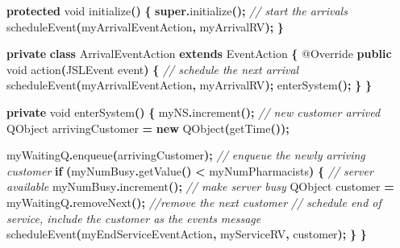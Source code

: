 \documentclass[
]{book}
\newenvironment{Shaded}{\begin{snugshade}}{\end{snugshade}}
\newcommand{\AttributeTok}[1]{\textcolor[rgb]{0.77,0.63,0.00}{#1}}
\newcommand{\CommentTok}[1]{\textcolor[rgb]{0.56,0.35,0.01}{\textit{#1}}}
\newcommand{\ControlFlowTok}[1]{\textcolor[rgb]{0.13,0.29,0.53}{\textbf{#1}}}
\newcommand{\DataTypeTok}[1]{\textcolor[rgb]{0.13,0.29,0.53}{#1}}
\newcommand{\FunctionTok}[1]{\textcolor[rgb]{0.00,0.00,0.00}{#1}}
\newcommand{\KeywordTok}[1]{\textcolor[rgb]{0.13,0.29,0.53}{\textbf{#1}}}
\newcommand{\NormalTok}[1]{#1}
\newcommand{\OperatorTok}[1]{\textcolor[rgb]{0.81,0.36,0.00}{\textbf{#1}}}
\theoremstyle{definition}
\theoremstyle{definition}
\theoremstyle{definition}
\theoremstyle{definition}
\theoremstyle{remark}
\begin{document}
\begin{Shaded}
\begin{Highlighting}[]
    \KeywordTok{protected} \DataTypeTok{void} \FunctionTok{initialize}\OperatorTok{()} \OperatorTok{\{}
        \KeywordTok{super}\OperatorTok{.}\FunctionTok{initialize}\OperatorTok{();}
        \CommentTok{// start the arrivals}
        \FunctionTok{scheduleEvent}\OperatorTok{(}\NormalTok{myArrivalEventAction}\OperatorTok{,}\NormalTok{ myArrivalRV}\OperatorTok{);}
    \OperatorTok{\}}

    \KeywordTok{private} \KeywordTok{class}\NormalTok{ ArrivalEventAction }\KeywordTok{extends}\NormalTok{ EventAction }\OperatorTok{\{}
        \AttributeTok{@Override}
        \KeywordTok{public} \DataTypeTok{void} \FunctionTok{action}\OperatorTok{(}\NormalTok{JSLEvent event}\OperatorTok{)} \OperatorTok{\{}
            \CommentTok{//   schedule the next arrival}
            \FunctionTok{scheduleEvent}\OperatorTok{(}\NormalTok{myArrivalEventAction}\OperatorTok{,}\NormalTok{ myArrivalRV}\OperatorTok{);}
            \FunctionTok{enterSystem}\OperatorTok{();}
        \OperatorTok{\}}
    \OperatorTok{\}}

    \KeywordTok{private} \DataTypeTok{void} \FunctionTok{enterSystem}\OperatorTok{()} \OperatorTok{\{}
\NormalTok{        myNS}\OperatorTok{.}\FunctionTok{increment}\OperatorTok{();} \CommentTok{// new customer arrived}
\NormalTok{        QObject arrivingCustomer }\OperatorTok{=} \KeywordTok{new} \FunctionTok{QObject}\OperatorTok{(}\FunctionTok{getTime}\OperatorTok{());}

\NormalTok{        myWaitingQ}\OperatorTok{.}\FunctionTok{enqueue}\OperatorTok{(}\NormalTok{arrivingCustomer}\OperatorTok{);} \CommentTok{// enqueue the newly arriving customer}
        \ControlFlowTok{if} \OperatorTok{(}\NormalTok{myNumBusy}\OperatorTok{.}\FunctionTok{getValue}\OperatorTok{()} \OperatorTok{\textless{}}\NormalTok{ myNumPharmacists}\OperatorTok{)} \OperatorTok{\{} \CommentTok{// server available}
\NormalTok{            myNumBusy}\OperatorTok{.}\FunctionTok{increment}\OperatorTok{();} \CommentTok{// make server busy}
\NormalTok{            QObject customer }\OperatorTok{=}\NormalTok{ myWaitingQ}\OperatorTok{.}\FunctionTok{removeNext}\OperatorTok{();} \CommentTok{//remove the next customer}
            \CommentTok{// schedule end of service, include the customer as the event\textquotesingle{}s message}
            \FunctionTok{scheduleEvent}\OperatorTok{(}\NormalTok{myEndServiceEventAction}\OperatorTok{,}\NormalTok{ myServiceRV}\OperatorTok{,}\NormalTok{ customer}\OperatorTok{);}
        \OperatorTok{\}}
    \OperatorTok{\}}
\end{Highlighting}
\end{Shaded}
\end{document}
